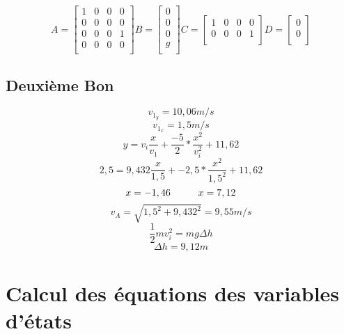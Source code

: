 \documentclass{article}
\begin{document}
\begin{equation}
	A = 
  	\begin{bmatrix}
  	1 & 0 & 0 & 0 \\ 
  	0 & 0 & 0 & 0 \\
  	0 & 0 & 0 & 1 \\ 
  	0 & 0 & 0 & 0 \\
  	\end{bmatrix}
  	B = 
  	\begin{bmatrix}
  	0 \\ 
  	0 \\ 
  	0 \\ 
  	g \\
  	\end{bmatrix}
  	C =
  	\begin{bmatrix}
  	1 & 0 & 0 & 0 \\ 
  	0 & 0 & 0 & 1 \\
  	\end{bmatrix}
  	D = 
  	\begin{bmatrix}
  	0 \\ 
  	0 \\
  	\end{bmatrix}
\end{equation}
\subsection{Deuxième Bon}
\begin{equation}
	v_{1_{y}} = 10,06 m/s 
\end{equation}
\begin{equation}
	v_{1_{x}} = 1,5 m/s 
\end{equation}
\begin{equation}
	y = v_{i}\frac{x}{v_{1}} + \frac{-5}{2}*\frac{x^2}{v_{i}^2} + 11,62
\end{equation}
\begin{equation}
	2,5 = 9,432\frac{x}{1,5} + -2,5*\frac{x^2}{1,5^2} + 11,62
\end{equation}
\begin{equation}
	x = -1,46  \hspace{10mm} x = 7,12
\end{equation}
\begin{equation}
	v_{A}=\sqrt{1,5^2 + 9,432^2} = 9,55 m/s
\end{equation}
\begin{equation}
	\frac{1}{2}mv_{i}^2 = mg\Delta h
\end{equation}
\begin{equation}
	\Delta h = 9,12m
\end{equation}

\section{Calcul des équations des variables d'états }
\end{document}
